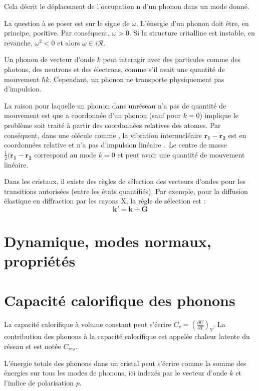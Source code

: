Cela décrit le déplacement de l'occupation n d'un phonon dans un mode donné.

La question à se poser est sur le signe de $\omega$. L'énergie d'un phonon doit
être, en principe, positive. Par conséquent, $\omega > 0$. Si la structure
critalline est instable, en revanche, $\omega^2 < 0$ et alors $\omega \in i\mathcal{R}$.

Un phonon de vecteur d'onde $k$ peut interagir avec des particules comme des
photons, des neutrons et des électrons, comme s'il avait une quantité de
mouvement $\hbar k$. Cependant, un phonon ne transporte physiquement pas 
d'impulsion.

La raison pour laquelle un phonon dans unréseau n'a pas de quantité de mouvement
est que a coordonnée d'un phonon (sauf pour $k=0$) implique le problème soit
traité à partir des coordonnées relatives des atomes. Par conséquent, dans une
olécule comme , la vibration internucléaire $\mathbf{r_1}-\mathbf{r_2}$
est en coordonnées relative et n'a pas d'impulsion linéaire . Le centre de masse
$\frac{1}{2}(\mathbf{r_1}-\mathbf{r_2}$ correspond au mode $k=0$ et peut avoir
une quantité de mouvement linéaire.

Dans les cristaux, il existe des règles de sélection des vecteurs d'ondes pour
les transitions autorisées (entre les états quantifiés).
Par exemple, pour la diffusion élastique en diffraction par les rayons X, la
règle de sélection est : 
\begin{equation}
\mathbf{k'} = \mathbf{k} + \mathbf{G}
\end{equation}




\section{Dynamique, modes normaux, propriétés}

\section{Capacité calorifique des phonons}

La capacité calorifique à volume constant peut s'écrire
$C_v = \left( \frac{\partial U}{\partial T}\right)_V$. La contribution des
phonons à la capacité calorifique est appelée chaleur latente du réseau et est
notée $C_{res}$.

L'énergie totale des phonons dans un cristal peut s'écrire comme la somme des
énergies sur tous les modes de phonons, ici indexés par le vecteur d'onde
$k$ et l'indice de polarisation $p$.

